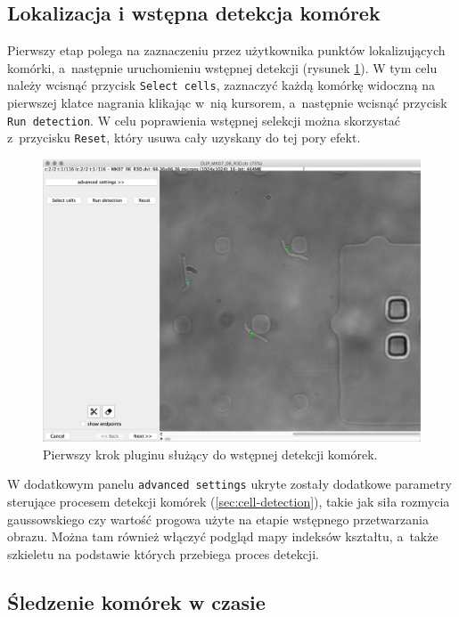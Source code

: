 \documentclass[declaration,shortabstract,mgr]{iithesis}
\begin{document}
\subsection{Lokalizacja i wstępna detekcja komórek}

Pierwszy etap polega na zaznaczeniu przez użytkownika punktów lokalizujących komórki, a~następnie uruchomieniu wstępnej detekcji (rysunek \ref{fig:ui-step-detector}).
W tym celu należy wcisnąć przycisk \texttt{Select cells}, zaznaczyć każdą komórkę widoczną na pierwszej klatce nagrania klikając w~nią kursorem, a~następnie wcisnąć przycisk \texttt{Run detection}.
W celu poprawienia wstępnej selekcji można skorzystać z~przycisku \texttt{Reset}, który usuwa cały uzyskany do tej pory efekt.

\begin{figure}
  \centering
  \includegraphics[width=\textwidth]{images/ui-step-detector.png}
  \caption{Pierwszy krok pluginu służący do wstępnej detekcji komórek.}
  \label{fig:ui-step-detector}
\end{figure}

W dodatkowym panelu \texttt{advanced settings} ukryte zostały dodatkowe parametry sterujące procesem detekcji komórek (\ref{sec:cell-detection}), takie jak siła rozmycia gaussowskiego czy wartość progowa użyte na etapie wstępnego przetwarzania obrazu.
Można tam również włączyć podgląd mapy indeksów kształtu, a~także szkieletu na podstawie których przebiega proces detekcji.

\subsection{Śledzenie komórek w czasie}
\end{document}
